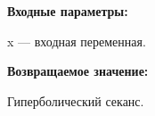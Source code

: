\textbf{Входные параметры:}

 x --- входная переменная.

\textbf{Возвращаемое значение:}

Гиперболический секанс.